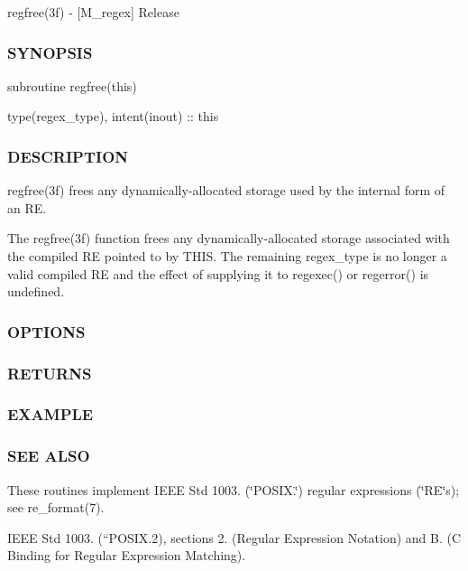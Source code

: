 regfree(3f) -\/ \mbox{[}M\+\_\+regex\mbox{]} Release \subsubsection*{S\+Y\+N\+O\+P\+S\+IS}

subroutine regfree(this)

type(regex\+\_\+type), intent(inout) \+:\+: this

\subsubsection*{D\+E\+S\+C\+R\+I\+P\+T\+I\+ON}

\begin{DoxyVerb}  regfree(3f) frees any dynamically-allocated storage used by the internal form of an RE.

  The regfree(3f) function frees any dynamically-allocated storage associated with the compiled RE pointed to by THIS.  The
  remaining regex_type is no longer a valid compiled RE and the effect of supplying it to regexec() or regerror() is undefined.
\end{DoxyVerb}


\subsubsection*{O\+P\+T\+I\+O\+NS}

\subsubsection*{R\+E\+T\+U\+R\+NS}

\subsubsection*{E\+X\+A\+M\+P\+LE}

\subsubsection*{S\+EE A\+L\+SO}

These routines implement I\+E\+EE Std 1003. (\char`\"{}\+P\+O\+S\+I\+X.\char`\"{}) regular expressions (\char`\"{}\+R\+E\char`\"{}s); see re\+\_\+format(7).

I\+E\+EE Std 1003. (``\+P\+O\+S\+IX.2\textquotesingle{}\textquotesingle{}), sections 2. (Regular Expression Notation) and B. (C Binding for Regular Expression Matching). \mbox{\label{namespacem__regex_a87c92921c53d800b316b0772140a8373}} 
